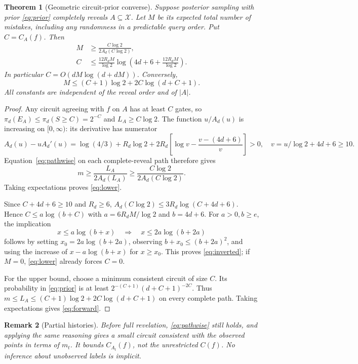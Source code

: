 \documentclass[11pt]{article}
\newtheorem{theorem}{Theorem}
\newtheorem{remark}[theorem]{Remark}
\newcommand{\cX}{\mathcal X}
\newcommand{\1}{\mathbf 1}
\begin{document}
\begin{theorem}[Geometric circuit-prior converse]\label{thm:bayes}
Suppose posterior sampling with prior \eqref{eq:prior} completely reveals
$A\subseteq\cX$. Let $M$ be its expected total number of mistakes,
including any randomness in a predictable query order. Put $C=C_A(f)$.
Then
\begin{align}
 M&\ge\frac{C\log2}{2A_d(C\log2)},\label{eq:lower}\\
 C&\le\frac{12R_dM}{\log2}
       \log\left(4d+6+\frac{12R_dM}{\log2}\right).
       \label{eq:inverted}
\end{align}
In particular $C=O(dM\log(d+dM))$. Conversely,
\begin{equation}\label{eq:forward}
 M\le(C+1)\log2+2C\log(d+C+1).
\end{equation}
All constants are independent of the reveal order and of $|A|$.
\end{theorem}
\begin{proof}
Any circuit agreeing with $f$ on $A$ has at least $C$ gates, so
$\pi_d(E_A)\le\pi_d(S\ge C)=2^{-C}$ and $L_A\ge C\log2$.
The function $u/A_d(u)$ is increasing on $[0,\infty)$: its derivative
has numerator
\[
 A_d(u)-uA_d'(u)
 =\log(4/3)+R_d\log2+
 2R_d\left[\log v-\frac{v-(4d+6)}v\right]>0,
 \quad v=u/\log2+4d+6\ge10.
\]
Equation~\eqref{eq:pathwise} on each complete-reveal path therefore gives
\[
 m\ge \frac{L_A}{2A_d(L_A)}
     \ge \frac{C\log2}{2A_d(C\log2)}.
\]
Taking expectations proves \eqref{eq:lower}.

Since $C+4d+6\ge10$ and $R_d\ge6$,
$A_d(C\log2)\le3R_d\log(C+4d+6)$. Hence
$C\le a\log(b+C)$ with
$a=6R_dM/\log2$ and $b=4d+6$.
For $a>0,b\ge e$, the implication
\[
 x\le a\log(b+x)\quad\Longrightarrow\quad
 x\le2a\log(b+2a)
\]
follows by setting $x_0=2a\log(b+2a)$, observing
$b+x_0\le(b+2a)^2$, and using the increase of
$x-a\log(b+x)$ for $x\ge x_0$. This proves \eqref{eq:inverted};
if $M=0$, \eqref{eq:lower} already forces $C=0$.

For the upper bound, choose a minimum consistent circuit of size $C$.
Its probability in \eqref{eq:prior} is at least
$2^{-(C+1)}(d+C+1)^{-2C}$. Thus
$m\le L_A\le(C+1)\log2+2C\log(d+C+1)$ on every complete path.
Taking expectations gives \eqref{eq:forward}.
\end{proof}

\begin{remark}[Partial histories]
Before full revelation, \eqref{eq:pathwise} still holds, and applying
the same reasoning gives a small circuit consistent with the observed
points in terms of $m_t$. It bounds $C_{A_t}(f)$, not the unrestricted
$C(f)$. No inference about unobserved labels is implicit.
\end{remark}
\end{document}
